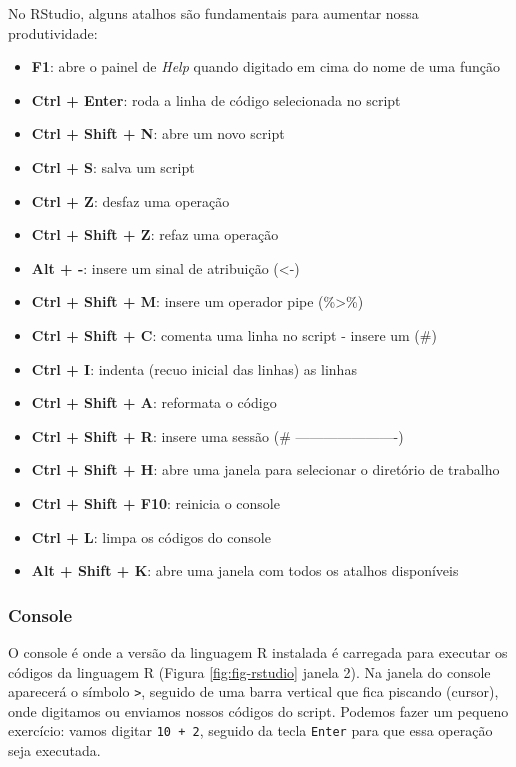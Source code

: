 \documentclass[
]{article}
\providecommand{\tightlist}{%
  \setlength{\itemsep}{0pt}\setlength{\parskip}{0pt}}
\begin{document}
No RStudio, alguns atalhos são fundamentais para aumentar nossa produtividade:

\begin{itemize}
\tightlist
\item
  \textbf{F1}: abre o painel de \emph{Help} quando digitado em cima do nome de uma função
\item
  \textbf{Ctrl + Enter}: roda a linha de código selecionada no script
\item
  \textbf{Ctrl + Shift + N}: abre um novo script
\item
  \textbf{Ctrl + S}: salva um script
\item
  \textbf{Ctrl + Z}: desfaz uma operação
\item
  \textbf{Ctrl + Shift + Z}: refaz uma operação
\item
  \textbf{Alt + -}: insere um sinal de atribuição (\textless-)
\item
  \textbf{Ctrl + Shift + M}: insere um operador pipe (\%\textgreater\%)
\item
  \textbf{Ctrl + Shift + C}: comenta uma linha no script - insere um (\#)
\item
  \textbf{Ctrl + I}: indenta (recuo inicial das linhas) as linhas
\item
  \textbf{Ctrl + Shift + A}: reformata o código
\item
  \textbf{Ctrl + Shift + R}: insere uma sessão (\# ----------------------)
\item
  \textbf{Ctrl + Shift + H}: abre uma janela para selecionar o diretório de trabalho
\item
  \textbf{Ctrl + Shift + F10}: reinicia o console
\item
  \textbf{Ctrl + L}: limpa os códigos do console
\item
  \textbf{Alt + Shift + K}: abre uma janela com todos os atalhos disponíveis
\end{itemize}

\hypertarget{console}{%
\subsubsection{Console}\label{console}}

O console é onde a versão da linguagem R instalada é carregada para executar os códigos da linguagem R (Figura \ref{fig:fig-rstudio} janela 2). Na janela do console aparecerá o símbolo \texttt{\textgreater{}}, seguido de uma barra vertical \texttt{\textbar{}} que fica piscando (cursor), onde digitamos ou enviamos nossos códigos do script. Podemos fazer um pequeno exercício: vamos digitar \texttt{10\ +\ 2}, seguido da tecla \texttt{Enter} para que essa operação seja executada.
\end{document}
